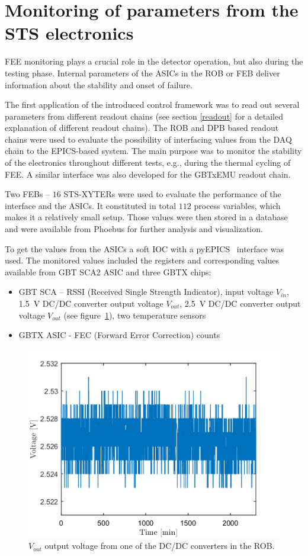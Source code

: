 
\section{Monitoring of parameters from the STS electronics}

\gls{FEE} monitoring plays a crucial role in the detector operation, but also during the testing phase. Internal parameters of the \glspl{ASIC} in the \gls{ROB} or \gls{FEB} deliver information about the stability and onset of failure.


The first application of the introduced control framework was to read out several parameters from different readout chains (see section \ref{readout} for a detailed explanation of different readout chains). The \gls{ROB} and \gls{DPB} based readout chains were used to evaluate the possibility of interfacing values from the \gls{DAQ} chain to the \gls{EPICS}-based system. The main purpose was to monitor the stability of the electronics throughout different tests, e.g., during the thermal cycling of \gls{FEE}. A similar interface was also developed for the GBTxEMU readout chain. 

Two \glspl{FEB} -- $16$ STS-XYTERs were used to evaluate the performance of the interface and the ASICs. It constituted in total $112$ process variables, which makes it a relatively small setup. Those values were then stored in a database and were available from Phoebus for further analysis and visualization.

To get the values from the \glspl{ASIC} a soft \gls{IOC} with a pyEPICS~\cite{pyEPICS} interface was used. The monitored values included the registers and corresponding values available from \gls{GBT} \gls{SCA2} \gls{ASIC} \cite{GBT_SCA_ASIC} and three GBTX chips: 
\begin{itemize}
    \item GBT SCA -- RSSI (Received Single Strength Indicator), input voltage $V_{in}$, \SI{1.5}{\volt} DC/DC converter output voltage $V_{out}$, \SI{2.5}{\volt} DC/DC converter output voltage $V_{out}$ (see figure~\ref{fig:ROB}), two temperature sensors
    \item GBTX \gls{ASIC} - FEC (Forward Error Correction) counts
\end{itemize}

\begin{figure}[!h]
    \centering
    \includegraphics[width=0.65\columnwidth]{Chapter4/images/ROB.png}
    \caption{$V_{out}$ output voltage from one of the DC/DC converters in the \gls{ROB}.}
    \label{fig:ROB}
\end{figure}

